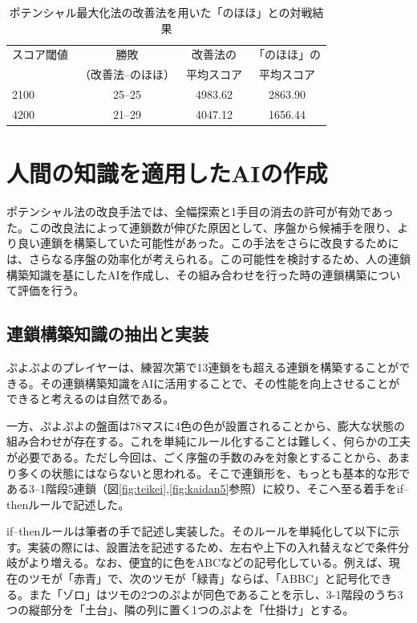 \documentclass[12pt]{jreport}
\begin{document}
\begin{table}[tb]
\begin{center}
\caption{ポテンシャル最大化法の改善法を用いた「のほほ」との対戦結果} \label{tab:poten_vs}
  \begin{tabular}{|l|c|c|c|} \hline
スコア閾値 & 勝敗 & 改善法の & 「のほほ」の\\
 & （改善法--のほほ）& 平均スコア & 平均スコア\\ \hline
2100 & 25--25 & 4983.62 & 2863.90\\ \hline
4200 & 21--29 & 4047.12 & 1656.44\\ \hline
\end{tabular}
\end{center}
\end{table}


\chapter{人間の知識を適用したAIの作成} \label{human} \setcounter{section}{0}
ポテンシャル法の改良手法では、全幅探索と1手目の消去の許可が有効であった。この改良法によって連鎖数が伸びた原因として、序盤から候補手を限り、より良い連鎖を構築していた可能性があった。この手法をさらに改良するためには、さらなる序盤の効率化が考えられる。この可能性を検討するため、人の連鎖構築知識を基にしたAIを作成し、その組み合わせを行った時の連鎖構築について評価を行う。

\section{連鎖構築知識の抽出と実装}
ぷよぷよのプレイヤーは、練習次第で13連鎖をも超える連鎖を構築することができる。その連鎖構築知識をAIに活用することで、その性能を向上させることができると考えるのは自然である。

一方、ぷよぷよの盤面は78マスに4色の色が設置されることから、膨大な状態の組み合わせが存在する。これを単純にルール化することは難しく、何らかの工夫が必要である。ただし今回は、ごく序盤の手数のみを対象とすることから、あまり多くの状態にはならないと思われる。そこで連鎖形を、もっとも基本的な形である3--1階段5連鎖（図\ref{fig:teikei},\ref{fig:kaidan5}参照）に絞り、そこへ至る着手をif--thenルールで記述した。

if--thenルールは筆者の手で記述し実装した。そのルールを単純化して以下に示す。実装の際には、設置法を記述するため、左右や上下の入れ替えなどで条件分岐がより増える。なお、便宜的に色をABCなどの記号化している。例えば、現在のツモが「赤青」で、次のツモが「緑青」ならば、「ABBC」と記号化できる。また「ゾロ」はツモの2つのぷよが同色であることを示し、3-1階段のうち3つの縦部分を「土台」、隣の列に置く1つのぷよを「仕掛け」とする。
\end{document}
